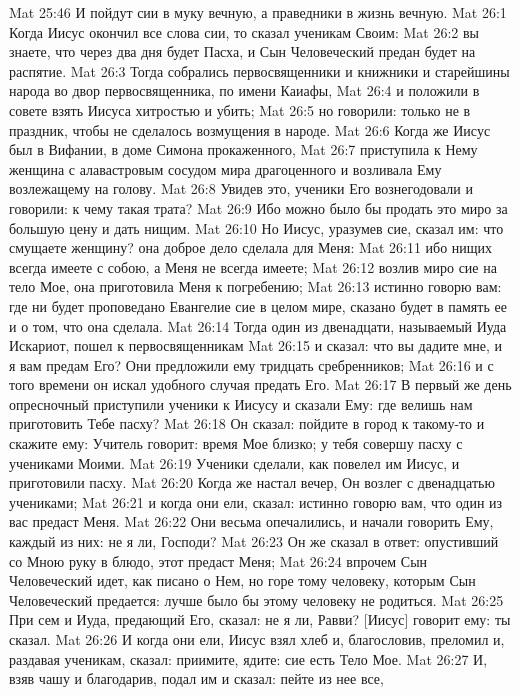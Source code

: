 Mat 25:46  И пойдут сии в муку вечную, а праведники в жизнь вечную.
Mat 26:1  Когда Иисус окончил все слова сии, то сказал ученикам Своим:
Mat 26:2  вы знаете, что через два дня будет Пасха, и Сын Человеческий предан будет на распятие.
Mat 26:3  Тогда собрались первосвященники и книжники и старейшины народа во двор первосвященника, по имени Каиафы,
Mat 26:4  и положили в совете взять Иисуса хитростью и убить;
Mat 26:5  но говорили: только не в праздник, чтобы не сделалось возмущения в народе.
Mat 26:6  Когда же Иисус был в Вифании, в доме Симона прокаженного,
Mat 26:7  приступила к Нему женщина с алавастровым сосудом мира драгоценного и возливала Ему возлежащему на голову.
Mat 26:8  Увидев это, ученики Его вознегодовали и говорили: к чему такая трата?
Mat 26:9  Ибо можно было бы продать это миро за большую цену и дать нищим.
Mat 26:10  Но Иисус, уразумев сие, сказал им: что смущаете женщину? она доброе дело сделала для Меня:
Mat 26:11  ибо нищих всегда имеете с собою, а Меня не всегда имеете;
Mat 26:12  возлив миро сие на тело Мое, она приготовила Меня к погребению;
Mat 26:13  истинно говорю вам: где ни будет проповедано Евангелие сие в целом мире, сказано будет в память ее и о том, что она сделала.
Mat 26:14  Тогда один из двенадцати, называемый Иуда Искариот, пошел к первосвященникам
Mat 26:15  и сказал: что вы дадите мне, и я вам предам Его? Они предложили ему тридцать сребренников;
Mat 26:16  и с того времени он искал удобного случая предать Его.
Mat 26:17  В первый же день опресночный приступили ученики к Иисусу и сказали Ему: где велишь нам приготовить Тебе пасху?
Mat 26:18  Он сказал: пойдите в город к такому-то и скажите ему: Учитель говорит: время Мое близко; у тебя совершу пасху с учениками Моими.
Mat 26:19  Ученики сделали, как повелел им Иисус, и приготовили пасху.
Mat 26:20  Когда же настал вечер, Он возлег с двенадцатью учениками;
Mat 26:21  и когда они ели, сказал: истинно говорю вам, что один из вас предаст Меня.
Mat 26:22  Они весьма опечалились, и начали говорить Ему, каждый из них: не я ли, Господи?
Mat 26:23  Он же сказал в ответ: опустивший со Мною руку в блюдо, этот предаст Меня;
Mat 26:24  впрочем Сын Человеческий идет, как писано о Нем, но горе тому человеку, которым Сын Человеческий предается: лучше было бы этому человеку не родиться.
Mat 26:25  При сем и Иуда, предающий Его, сказал: не я ли, Равви? [Иисус] говорит ему: ты сказал.
Mat 26:26  И когда они ели, Иисус взял хлеб и, благословив, преломил и, раздавая ученикам, сказал: приимите, ядите: сие есть Тело Мое.
Mat 26:27  И, взяв чашу и благодарив, подал им и сказал: пейте из нее все,
